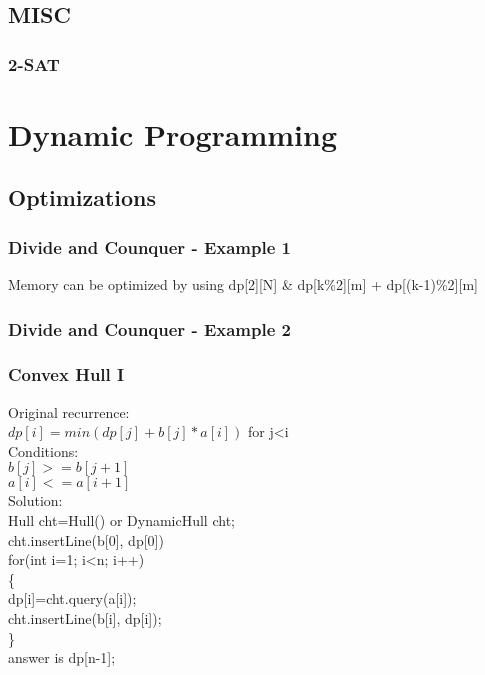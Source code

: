 \documentclass[10pt,a4paper]{report}
\newcommand\tab[1][1cm]{\hspace*{#1}}
\begin{document}
	\newpage	
	\section{MISC}
		\subsection{2-SAT}
			
		
\chapter{Dynamic Programming}

	\section{Optimizations}
		\subsection{Divide and Counquer - Example 1}
			Memory can be optimized by using dp[2][N] \& dp[k\%2][m] + dp[(k-1)\%2][m]\\
			
		\newpage
		\subsection{Divide and Counquer - Example 2}
			
		\newpage
		\subsection{Convex Hull I}
			Original recurrence:\\
			\tab $dp[i]=min(dp[j]+b[j]*a[i])$ for j<i\\
			Conditions:\\
			\tab $b[j]>=b[j+1]$\\
			\tab $a[i]<=a[i+1]$\\
			Solution:\\
			Hull cht=Hull() or DynamicHull cht;\\
			cht.insertLine(b[0], dp[0])\\
			for(int i=1; i<n; i++)\\
			\{\\
				\tab dp[i]=cht.query(a[i]);\\
				\tab cht.insertLine(b[i], dp[i]);\\
			\}\\
			answer is dp[n-1];
\end{document}
